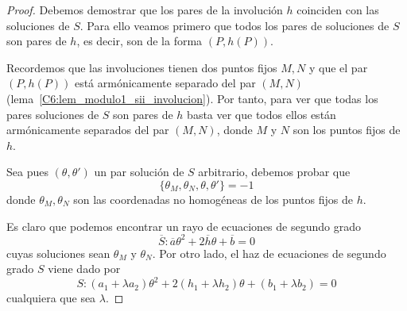 \begin{proof}
	Debemos demostrar que  los pares de la involución $h$ coinciden con las soluciones de $S$. Para ello veamos primero que todos los pares de soluciones de $S$ son pares de $h$, es decir, son de la forma $(P,h(P))$. 
	
	Recordemos que las involuciones tienen dos puntos fijos $M,N$ y que el par $(P,h(P))$ está armónicamente separado del par $(M,N)$ (lema~\ref{C6:lem_modulo1_sii_involucion}). Por tanto, para ver que todas los pares soluciones de $S$ son pares de $h$ basta ver que todos ellos están armónicamente separados del par $(M,N)$, donde $M$ y $N$ son los puntos fijos de $h$.
	
	Sea pues $(\theta,\theta')$ un par solución de $S$ arbitrario, debemos probar que 
	\begin{equation*}
		\{\theta_M,\theta_N,\theta,\theta'\}=-1
	\end{equation*}
	donde $\theta_M,\theta_N$ son las coordenadas no homogéneas de los puntos fijos de $h$. 
	
	Es claro que podemos encontrar un rayo de ecuaciones de segundo grado
	\begin{equation*}
		\overline{S}:\overline{a}\theta^2+2\overline{h}\theta+\overline{b}=0
	\end{equation*}
	cuyas soluciones sean $\theta_M$ y $\theta_N$. Por otro lado, el haz de ecuaciones de segundo grado $S$ viene dado por
	\begin{equation*}
		S:(a_1+\lambda a_2)\theta^2+2(h_1+\lambda h_2)\theta+(b_1+\lambda b_2)=0
	\end{equation*}
	cualquiera que sea $\lambda$.
	

\end{proof}
